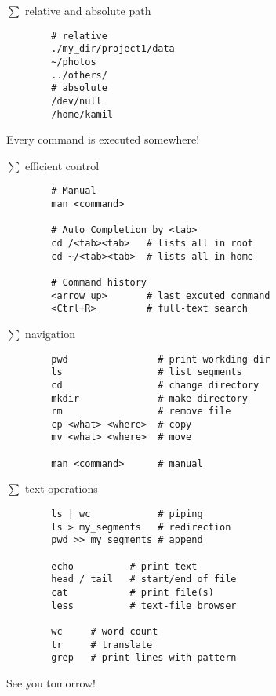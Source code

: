 \documentclass[xcolor=dvipsnames]{beamer}
\begin{document}
\begin{frame}[fragile]
	$\sum$ relative and absolute path
	\Large
	\begin{verbatim}
		# relative
		./my_dir/project1/data
		~/photos
		../others/
		# absolute
		/dev/null
		/home/kamil
	\end{verbatim}
	Every command is executed somewhere!
\end{frame}

\begin{frame}[fragile]
	$\sum$ efficient control
	\Large
	\begin{verbatim}
		# Manual
		man <command>

		# Auto Completion by <tab>
		cd /<tab><tab>   # lists all in root
		cd ~/<tab><tab>  # lists all in home

		# Command history
		<arrow_up>       # last excuted command
		<Ctrl+R>         # full-text search
	\end{verbatim}
\end{frame}

\begin{frame}[fragile]
	$\sum$ navigation
	\Large
	\begin{verbatim}
		pwd                # print workding dir
		ls                 # list segments
		cd                 # change directory
		mkdir              # make directory
		rm                 # remove file
		cp <what> <where>  # copy
		mv <what> <where>  # move

		man <command>      # manual
	\end{verbatim}
\end{frame}

\begin{frame}[fragile]
	$\sum$ text operations
	\Large
	\begin{verbatim}
		ls | wc            # piping
		ls > my_segments   # redirection
		pwd >> my_segments # append

		echo          # print text
		head / tail   # start/end of file
		cat           # print file(s)
		less          # text-file browser

		wc     # word count
		tr     # translate
		grep   # print lines with pattern
	\end{verbatim}
\end{frame}

\begin{frame}[fragile]
	\begin{center}
		\Huge
		See you tomorrow!
	\end{center}
\end{frame}
\end{document}

